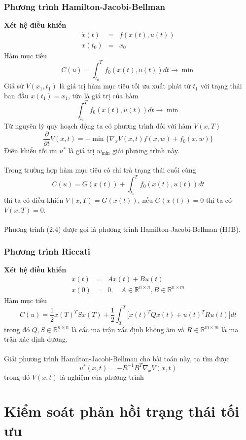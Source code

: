 \documentclass[12pt,a4paper]{report}
\begin{document}
\subsection{Phương trình Hamilton-Jacobi-Bellman}
\textbf{Xét hệ điều khiển} 
\begin{eqnarray}
	\dot{x}(t) &=& f(x(t), u(t)) \nonumber \\ x(t_0) &=& x_0 \nonumber
\end{eqnarray} Hàm mục tiêu $$C(u) = \int_{t_0}^{T}f_0(x(t), u(t))dt \to \min$$
Giả sử $V(x_1, t_1)$ là giá trị hàm mục tiêu tối ưu xuất phát từ $t_1$ với trạng thái ban đầu $x(t_1) = x_1$, tức là giá trị của hàm $$\int_{t_1}^{T}f_0(x(t), u(t))dt \to \min$$ Từ nguyên lý quy hoạch động ta có phương trình đối với hàm $V(x, T)$ \begin{equation}
	\dfrac{\partial}{\partial t}V(x, t) = - \min\big\{\nabla_xV(x,t)f(x, w) + f_0(x, w)\big\}
\end{equation} 
Điều khiển tối ưu $u^*$ là giá trị $w_{\min}$ giải phương trình này. \\\\ Trong trường hợp hàm mục tiêu có chi trả trạng thái cuối cùng $$C(u) = G(x(t)) + \int_{t_0}^{T}f_0(x(t), u(t))dt$$ thì ta có điều khiển $V(x, T) = G(x(t))$, nếu $G(x(t)) = 0$ thì ta có $V(x, T) = 0$.\\\\ Phương trình (2.4) được gọi là phương trình Hamilton-Jacobi-Bellman (HJB).
\subsection{Phương trình Riccati}
\textbf{Xét hệ điều khiển}
\begin{eqnarray}
	\dot{x}(t) &=& Ax(t) + Bu(t) \nonumber\\ x(0) &=& 0, \quad A \in \mathbb{R}^{n\times n}, B \in \mathbb{R}^{n\times m} \nonumber
\end{eqnarray} Hàm mục tiêu $$C(u) = \dfrac{1}{2}x(T)^TSx(T) + \dfrac{1}{2}\int_{0}^{T}\Big[x(t)^TQx(t) + u(t)^TRu(t)\Big]dt$$ trong đó $Q, S \in \mathbb{R}^{n\times n}$ là các ma trận xác định không âm và $R \in \mathbb{R}^{m\times m}$ là ma trận xác định dương.\\\\ Giải phương trình Hamilton-Jacobi-Bellman cho bài toán này, ta tìm được $$u^*(x, t) = -R^{-1}B^T\nabla_xV(x, t)$$ trong đó $V(x, t)$ là nghiệm của phương trình
	\chapter{Kiểm soát phản hồi trạng thái tối ưu}
\end{document}
